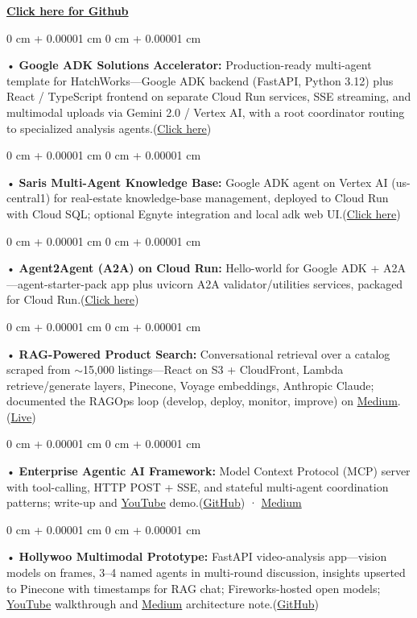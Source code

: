 \documentclass[10pt, letterpaper]{article}
\newenvironment{onecolentry}{
    \begin{adjustwidth}{
        0 cm + 0.00001 cm
    }{
        0 cm + 0.00001 cm
    }
}{
    \end{adjustwidth}
} %
\begin{document}
\textbf{\href{https://github.com/daedalus-s}{Click here for Github}}
\begin{onecolentry}
     • \textbf{Google ADK Solutions Accelerator:} Production-ready multi-agent template for HatchWorks---Google ADK backend (FastAPI, Python 3.12) plus React / TypeScript frontend on separate Cloud Run services, SSE streaming, and multimodal uploads via Gemini 2.0 / Vertex AI, with a root coordinator routing to specialized analysis agents.(\href{https://github.com/sreenikethaathreya-hw/adksolutionsaccelerator}{Click here})
\end{onecolentry}
\begin{onecolentry}
     • \textbf{Saris Multi-Agent Knowledge Base:} Google ADK agent on Vertex AI (us-central1) for real-estate knowledge-base management, deployed to Cloud Run with Cloud SQL; optional Egnyte integration and local adk web UI.(\href{https://github.com/sreenikethaathreya-hw/SRS-Saris-multi-agent}{Click here})
\end{onecolentry}
\begin{onecolentry}
     • \textbf{Agent2Agent (A2A) on Cloud Run:} Hello-world for Google ADK + A2A---agent-starter-pack app plus uvicorn A2A validator/utilities services, packaged for Cloud Run.(\href{https://github.com/daedalus-s/szns-adk-a2a}{Click here})
\end{onecolentry}
\begin{onecolentry}
     • \textbf{RAG-Powered Product Search:} Conversational retrieval over a catalog scraped from {$\sim$}15,000 listings---React on S3 + CloudFront, Lambda retrieve/generate layers, Pinecone, Voyage embeddings, Anthropic Claude; documented the RAGOps loop (develop, deploy, monitor, improve) on \href{https://medium.com/@sreenikethaathreya/from-rags-to-riches-bba8a671d5e6}{Medium}.(\href{https://prorecsa.co}{Live})
\end{onecolentry}
\begin{onecolentry}
     • \textbf{Enterprise Agentic AI Framework:} Model Context Protocol (MCP) server with tool-calling, HTTP POST + SSE, and stateful multi-agent coordination patterns; write-up and \href{https://www.youtube.com/watch?v=op2gTYyFb5U}{YouTube} demo.(\href{https://github.com/daedalus-s/dota2-mcp-server}{GitHub}) · \href{https://medium.com/@sreenikethaathreya/get-good-at-using-ai-noob-5d2576203112}{Medium}
\end{onecolentry}
\begin{onecolentry}
     • \textbf{Hollywoo Multimodal Prototype:} FastAPI video-analysis app---vision models on frames, 3--4 named agents in multi-round discussion, insights upserted to Pinecone with timestamps for RAG chat; Fireworks-hosted open models; \href{https://www.youtube.com/watch?v=KBs_3V0OAgU}{YouTube} walkthrough and \href{https://medium.com/@sreenikethaathreya/hollywoo-ai-video-analysis-5eae37ca7e16}{Medium} architecture note.(\href{https://github.com/daedalus-s/fireworks-video-discussion}{GitHub})
\end{onecolentry}
\vspace{2 pt}
        \vspace{2 pt }
\end{document}
